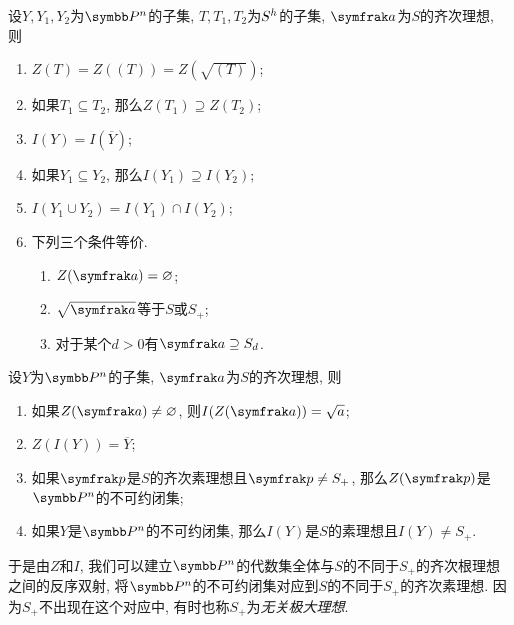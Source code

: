 \begin{propositionnoproof}\label{prop:projectivegaloisconnectionclosedradicalpre}
  设$Y, Y_1, Y_2$为$\PP^n$的子集, $T, T_1, T_2$为$S^h$的子集, $\ideal{a}$为$S$的齐次理想, 则
  \begin{enumerate}
    \item\label{enum:prop-projective-galois-connection-closed-radical-1} $Z(T)=Z((T))=Z(\sqrt{(T)})$;
    \item\label{enum:prop-projective-galois-connection-closed-radical-2} 如果$T_1\subseteq T_2$, 那么$Z(T_1)\supseteq Z(T_2)$;
    \item\label{enum:prop-projective-galois-connection-closed-radical-3} $I(Y)=I(\overline{Y})$;
    \item\label{enum:prop-projective-galois-connection-closed-radical-4} 如果$Y_1\subseteq Y_2$, 那么$I(Y_1)\supseteq I(Y_2)$;
    \item\label{enum:prop-projective-galois-connection-closed-radical-5} $I(Y_1\cup Y_2)=I(Y_1)\cap I(Y_2)$;
    \item 下列三个条件等价.
    \begin{enumerate}
      \item $Z(\ideal{a})=\varnothing$;
      \item $\sqrt{\ideal{a}}$等于$S$或$S_+$;
      \item 对于某个$d>0$有$\ideal{a}\supseteq S_d$.
    \end{enumerate}
  \end{enumerate}
\end{propositionnoproof}

\begin{proposition}\label{prop:projectivegaloisconnectionclosedradical}
  设$Y$为$\PP^n$的子集, $\ideal{a}$为$S$的齐次理想, 则
  \begin{enumerate}
    \item\label{enum:prop-projective-galois-connection-closed-radical-nullstellensatz} 如果$Z(\ideal{a})\neq\varnothing$, 则$I(Z(\ideal{a}))=\sqrt{a}$;
    \item\label{enum:prop-projective-galois-connection-closed-radical-closure} $Z(I(Y))=\overline{Y}$;
    \item\label{enum:prop-projective-galois-connection-closed-radical-8} 如果$\ideal{p}$是$S$的齐次素理想且$\ideal{p}\neq S_+$, 那么$Z(\ideal{p})$是$\PP^n$的不可约闭集;
    \item\label{enum:prop-projective-galois-connection-closed-radical-9} 如果$Y$是$\PP^n$的不可约闭集, 那么$I(Y)$是$S$的素理想且$I(Y)\neq S_+$.
  \end{enumerate}
  于是由$Z$和$I$, 我们可以建立$\PP^n$的代数集全体与$S$的不同于$S_+$的齐次根理想之间的反序双射, 将$\PP^n$的不可约闭集对应到$S$的不同于$S_+$的齐次素理想. 因为$S_+$不出现在这个对应中, 有时也称$S_+$为\emph{无关极大理想}.
\end{proposition}

